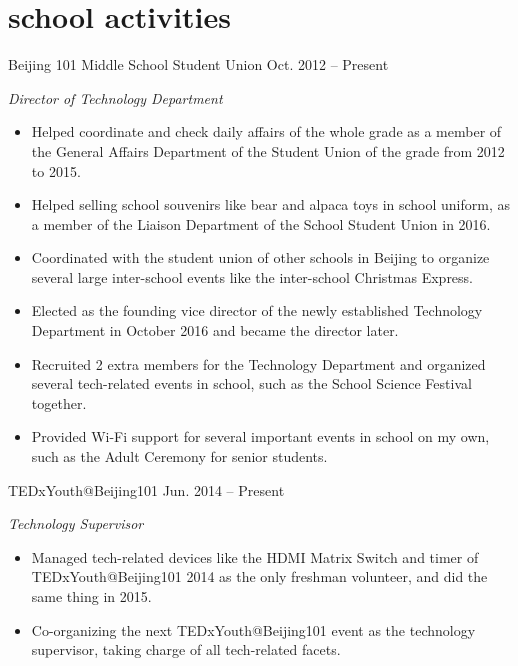 \documentclass[]{adamyi-cv} %
\begin{document}

\section{school activities}

\begin{entrylist}


\entry
{Beijing 101 Middle School Student Union}
{Oct. 2012 -- Present}
{\emph{Director of Technology Department}
\begin{itemize}
\item Helped coordinate and check daily affairs of the whole grade as a member of the General Affairs Department of the Student Union of the grade from 2012 to 2015.
\item Helped selling school souvenirs like bear and alpaca toys in school uniform, as a member of the Liaison Department of the School Student Union in 2016.
\item Coordinated with the student union of other schools in Beijing to organize several large inter-school events like the inter-school Christmas Express.
\item Elected as the founding vice director of the newly established Technology Department in October 2016 and became the director later.
\item Recruited 2 extra members for the Technology Department and organized several tech-related events in school, such as the School Science Festival together.
\item Provided Wi-Fi support for several important events in school on my own, such as the Adult Ceremony for senior students.
\end{itemize}}


\entry
{TEDxYouth@Beijing101}
{Jun. 2014 -- Present}
{\emph{Technology Supervisor}
\begin{itemize}
\item Managed tech-related devices like the HDMI Matrix Switch and timer of TEDxYouth@Beijing101 2014 as the only freshman volunteer, and did the same thing in 2015.
\item Co-organizing the next TEDxYouth@Beijing101 event as the technology supervisor, taking charge of all tech-related facets.
\end{itemize}}


\end{entrylist}
\end{document}
